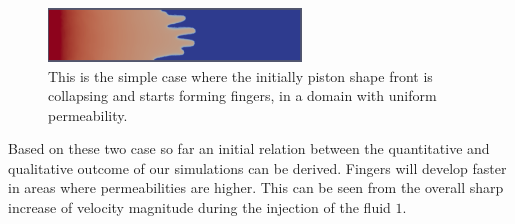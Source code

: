 \documentclass[preprint,authoryear,12pt]{elsarticle}
\begin{document}
\begin{figure}[h]
\begin{center}
\includegraphics[width=0.6\textwidth]{./Pics1/phase_vol_frac_unif_perm.pdf}
\caption{This is the simple case where the initially piston shape front is collapsing and starts forming fingers, in a domain with uniform permeability.}
\label{fig:simple_case}
\end{center}
\end{figure}

Based on these two case so far an initial relation between the quantitative and qualitative outcome of our simulations can be derived. Fingers will develop faster in areas where permeabilities are higher. This can be seen from the overall sharp increase of velocity magnitude during the injection of the fluid $1$. 

         
\end{document}
